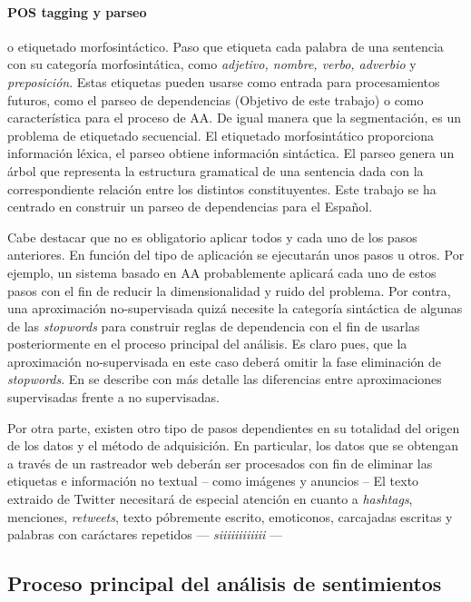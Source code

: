 \paragraph{POS tagging y parseo} o etiquetado morfosintáctico. Paso que etiqueta
cada palabra de una sentencia con su categoría morfosintática, como
\emph{adjetivo, nombre, verbo, adverbio} y \emph{preposición}. Estas etiquetas
pueden usarse como entrada para procesamientos futuros, como el parseo de
dependencias (Objetivo de este trabajo) o como característica para el proceso de
\ac{AA}. De igual manera que la segmentación, es un problema de etiquetado
secuencial. El etiquetado morfosintático proporciona información léxica, el
parseo obtiene información sintáctica. El parseo genera un árbol que representa
la estructura gramatical de una sentencia dada con la correspondiente relación
entre los distintos constituyentes. Este trabajo se ha centrado en construir un
parseo de dependencias para el Español.

Cabe destacar que no es obligatorio aplicar todos y cada uno de los pasos
anteriores. En función del tipo de aplicación se ejecutarán unos pasos u
otros. Por ejemplo, un sistema basado en \ac{AA} probablemente aplicará cada uno
de estos pasos con el fin de reducir la dimensionalidad y ruido del
problema. Por contra, una aproximación no-supervisada quizá necesite la
categoría sintáctica de algunas de las \emph{stopwords} para construir reglas de
dependencia con el fin de usarlas posteriormente en el proceso principal del
análisis. Es claro pues, que la aproximación no-supervisada en este caso deberá
omitir la fase eliminación de \emph{stopwords}. En  se
describe con más detalle las diferencias entre aproximaciones supervisadas
frente a no supervisadas.

Por otra parte, existen otro tipo de pasos dependientes en su totalidad del
origen de los datos y el método de adquisición. En particular, los datos que se
obtengan a través de un rastreador web deberán ser procesados con fin de
eliminar las etiquetas  e información no textual -- como
imágenes y anuncios -- El texto extraido de Twitter necesitará de especial
atención en cuanto a \emph{hashtags}, menciones, \emph{retweets}, texto
póbremente escrito, emoticonos, carcajadas escritas y palabras con caráctares
repetidos --- \emph{siiiiiiiiiiii} ---

\subsection{Proceso principal del análisis de sentimientos}
\label{sec:omcore}

